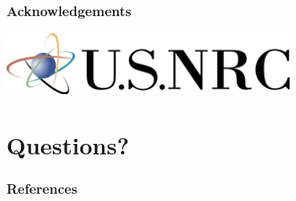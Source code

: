 \documentclass[12pt]{beamer}
\begin{document}
\begin{frame}[fragile]
\frametitle{Acknowledgements}

\includegraphics[height=2cm]{figures/NRClogo.png} \\

\end{frame}


\section*{Questions?}

\begin{frame}[plain]
        \tiny
        \frametitle{References}
        
        \color{black}
        
\end{frame}

\end{document}
